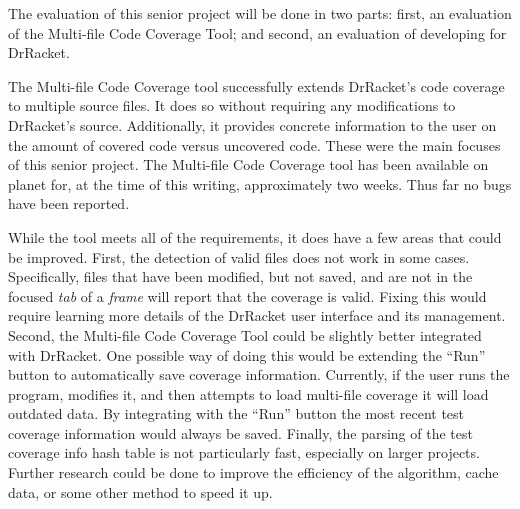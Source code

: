 The evaluation of this senior project will be done in two parts: first, an evaluation of the Multi-file Code Coverage Tool; and second, an evaluation of developing for DrRacket.

The Multi-file Code Coverage tool successfully extends DrRacket's code coverage to multiple source files. It does so without requiring any modifications to DrRacket's source. Additionally, it provides concrete information to the user on the amount of covered code versus uncovered code. These were the main focuses of this senior project. The Multi-file Code Coverage tool has been available on planet for, at the time of this writing, approximately two weeks. Thus far no bugs have been reported.

While the tool meets all of the requirements, it does have a few areas that could be improved. First, the detection of valid files does not work in some cases. Specifically, files that have been modified, but not saved, and are not in the focused \emph{tab} of a \emph{frame} will report that the coverage is valid. Fixing this would require learning more details of the DrRacket user interface and its management. Second, the Multi-file Code Coverage Tool could be slightly better integrated with DrRacket. One possible way of doing this would be extending the ``Run'' button to automatically save coverage information. Currently, if the user runs the program, modifies it, and then attempts to load multi-file coverage it will load outdated data. By integrating with the ``Run'' button the most recent test coverage information would always be saved. Finally, the parsing of the test coverage info hash table is not particularly fast, especially on larger projects. Further research could be done to improve the efficiency of the algorithm, cache data, or some other method to speed it up.